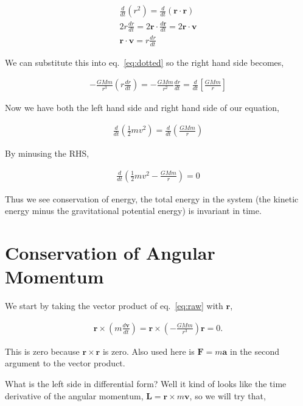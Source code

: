 \documentclass[11pt]{amsart}
\begin{document}
\begin{align*}
  \frac{d}{dt}\left(r^2\right) = \frac{d}{dt}\left(\mathbf{r}\cdot\mathbf{r}\right) \\
  2r\frac{dr}{dt} = 2\mathbf{r}\cdot\frac{d\mathbf{r}}{dt} = 2\mathbf{r}\cdot\mathbf{v} \\
  \mathbf{r}\cdot\mathbf{v}=r\frac{dr}{dt}
\end{align*}

We can substitute this into eq.~\ref{eq:dotted} so the right hand side becomes,

\begin{align*}
  - \frac{GMm}{r^3} \left(r\frac{dr}{dt}\right) = - \frac{GMm}{r^2} \frac{dr}{dt} = \frac{d}{dt}\left[\frac{GMm}{r}\right]
\end{align*}

Now we have both the left hand side and right hand side of our equation,

\begin{align*}
  \frac{d}{dt}\left(\frac{1}{2}mv^2\right) = \frac{d}{dt}\left(\frac{GMm}{r}\right)
\end{align*}

By minusing the RHS,

\begin{align*}
  \frac{d}{dt}\left(\frac{1}{2}mv^2 - \frac{GMm}{r}\right) = 0
\end{align*}

Thus we see conservation of energy, the total energy in the system (the kinetic energy minus the gravitational potential energy) is invariant in time.

\section{Conservation of Angular Momentum}

We start by taking the vector product of eq.~\ref{eq:raw} with $\mathbf{r}$,

\begin{align}
  \label{eq:cross}
  \mathbf{r}\times\left(m\frac{d\mathbf{v}}{dt}\right) = \mathbf{r}\times\left(- \frac{GMm}{r^3}\right)\mathbf{r} = 0.
\end{align}

This is zero because $\mathbf{r}\times\mathbf{r}$ is zero. Also used here is $\mathbf{F} = m\mathbf{a}$ in the second argument to the vector product.

What is the left side in differential form? Well it kind of looks like the time derivative of the angular momentum, $\mathbf{L} = \mathbf{r}\times m\mathbf{v}$, so we will try that,
\end{document}
